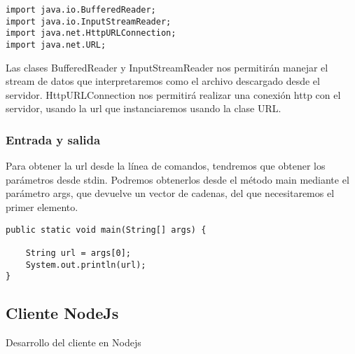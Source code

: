 \documentclass[11pt]{article}
\begin{document}
\begin{verbatim}
import java.io.BufferedReader;
import java.io.InputStreamReader;
import java.net.HttpURLConnection;
import java.net.URL;
\end{verbatim}

Las clases BufferedReader y InputStreamReader nos permitirán manejar el stream de datos
que interpretaremos como el archivo descargado desde el servidor.
HttpURLConnection nos permitirá realizar una conexión http con el servidor,
usando la url que instanciaremos usando la clase URL.

\subsubsection{Entrada y salida}
\label{sec:org0b79fea}
Para obtener la url desde la línea de comandos, tendremos que obtener los parámetros desde stdin.
Podremos obtenerlos desde el método main mediante el parámetro args,
que devuelve un vector de cadenas, del que necesitaremos el primer elemento.

\begin{verbatim}
public static void main(String[] args) {

    String url = args[0];
    System.out.println(url);
}
\end{verbatim}

\subsection{Cliente NodeJs}
\label{sec:org058c877}
Desarrollo del cliente en Nodejs
\end{document}
